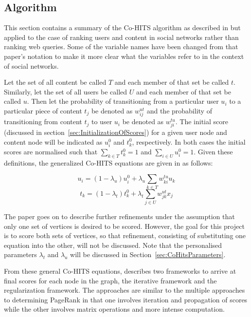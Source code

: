 \subsection{Algorithm}
\label{sec:CoHitsAlgorithm}

This section contains a summary of the Co-HITS algorithm as described in \cite{Deng2009} but applied to the case of ranking users and content in social networks rather than ranking web queries. Some of the variable names have been changed from that paper's notation to make it more clear what the variables refer to in the context of social networks.

Let the set of all content be called $T$ and each member of that set be called $t$. Similarly, let the set of all users be called $U$ and each member of that set be called $u$. Then let the probability of transitioning from a particular user $u_{i}$ to a particular piece of content $t_{j}$ be denoted as $w_{ij}^{ut}$ and the probability of transitioning from content $t_{j}$ to user $u_{i}$ be denoted as $w_{ji}^{tu}$. The initial score (discussed in section~\ref{sec:InitializationOfScores}) for a given user node and content node will be indicated as $u_{i}^{0}$ and $t_{k}^0$, respectively. In both cases the initial scores are normalised such that $\sum\limits_{k \in T} t_{k}^{0} = 1$ and $\sum\limits_{i \in U} u_{i}^{0} = 1$. Given these definitions, the generalized Co-HITS equations are given in \cite{Deng2009} as follows:

\begin{center}
\[u_{i} = (1 - \lambda_{u}) u_{i}^{0} + \lambda_{u}  \sum\limits_ {k \in T} w_{ki}^{tu} u_{k}\]
\[t_{k} = (1 - \lambda_{t}) t_{k}^{0} + \lambda_{t}  \sum\limits_ {j \in U} w_{jk}^{ut} x_{j}\]
\end{center}

The paper goes on to describe further refinements under the assumption that only one set of vertices is desired to be scored. However, the goal for this project is to score both sets of vertices, so that refinement, consisting of substituting one equation into the other, will not be discussed. Note that the personalised parameters $\lambda_{t}$ and $\lambda_{u}$ will be discussed in Section~\ref{sec:CoHitsParameters}.

From these general Co-HITS equations, \cite{Deng2009} describes two frameworks to arrive at final scores for each node in the graph, the iterative framework and the regularization framework. The approaches are similar to the multiple approaches to determining PageRank in that one involves iteration and propagation of scores while the other involves matrix operations and more intense computation.

